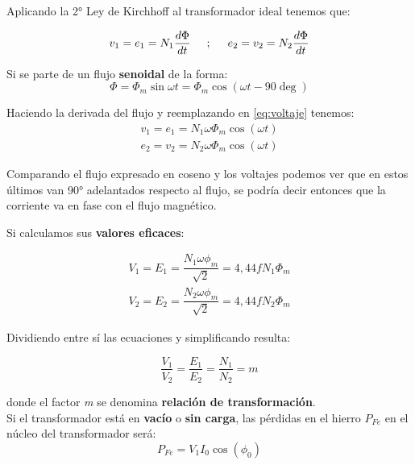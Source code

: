  
 Aplicando la 2° Ley de Kirchhoff al transformador ideal tenemos que:
 
\begin{equation}
	v_1 = e_1 = N_1 \dfrac{d\Phi}{dt} \hspace{.5cm};\hspace{.5cm} e_2 = v_2 = N_2 \dfrac{d\Phi}{dt}
	\label{eq:voltaje}
\end{equation}

Si se parte de un flujo \textbf{senoidal} de la forma:
\begin{equation}
	\Phi = \Phi_m \sin{\omega t} = \Phi_m \cos\left(\omega t - 90\deg\right)
\end{equation}

Haciendo la derivada del flujo y reemplazando en \ref{eq:voltaje} tenemos:
\begin{equation*}
	\begin{split}
		v_1 = e_1 = N_1 \omega \Phi_m \cos\left(\omega t\right) \\
		e_2 = v_2 = N_2 \omega \Phi_m \cos\left(\omega t\right)
	\end{split}
\end{equation*}

Comparando el flujo expresado en coseno y los voltajes podemos ver que en estos últimos van 90° adelantados respecto al flujo, se podría decir entonces que la corriente va en fase con el flujo magnético. 

Si calculamos sus \textbf{valores eficaces}:

\begin{equation}
	\begin{split}
		V_1 = E_1 = \dfrac{N_1 \omega \phi_m}{\sqrt{2}} = 4,44 f N_1 \Phi_m \\
		V_2 = E_2 = \dfrac{N_2 \omega \phi_m}{\sqrt{2}} = 4,44 f N_2 \Phi_m
	\end{split}
\end{equation}

Dividiendo entre sí las ecuaciones y simplificando resulta:

\begin{equation}
	\dfrac{V_1}{V_2} = \dfrac{E_1}{E_2} = \dfrac{N_1}{N_2} = m
\end{equation} 

donde el factor \textit{m} se denomina \textbf{relación de transformación}.\\

Si el transformador está en \textbf{vacío} o \textbf{sin carga}, las pérdidas en el hierro $P_{Fe}$ en el núcleo del transformador será:
\begin{equation}
	P_{Fe} = V_{1} I_{0} \cos \left(\phi_{0}\right)
\end{equation}

